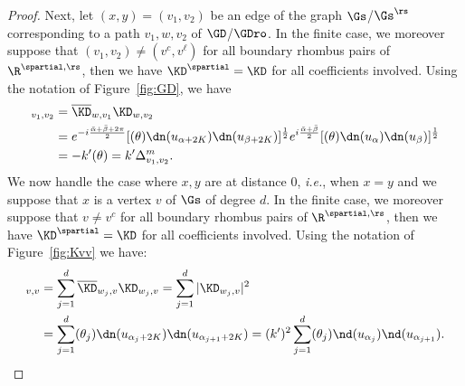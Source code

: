 \documentclass[a4paper,twoside,11pt]{article}
\begin{document}
\begin{proof}
Next, let $(x,y)=(v_1,v_2)$ be an edge of the graph $\Gs$/$\Gs^\rs$ corresponding to a path $v_1,w,v_2$ of $\GD$/$\GDro$. In the finite
case, we moreover suppose that $(v_1,v_2)\neq (v^c,v^\ell)$ for all boundary rhombus pairs of $\R^{\spartial,\rs}$, 
then we have $\KD^\spartial=\KD$ for all coefficients involved. 
Using the notation of Figure~\ref{fig:GD}, we have
\begin{align*}
[\overline{\KD}^{\,t\,}\KD]_{v_1,v_2}&=\overline{\KD}_{w,v_1}\KD_{w,v_2}\\
&=e^{-i\frac{\bar{\alpha}+\bar{\beta}+2\pi}{2}}[\sc(\theta)\dn(u_{\alpha+2K})\dn(u_{\beta+2K})]^{\frac{1}{2}}
e^{i\frac{\bar{\alpha}+\bar{\beta}}{2}}[\sc(\theta)\dn(u_{\alpha})\dn(u_\beta)]^{\frac{1}{2}}\\
&=-k'\sc(\theta)=k'\Delta^m_{v_1,v_2}.
\end{align*}
We now handle the case where $x,y$ are at distance $0$, \emph{i.e.}, when $x=y$ and we suppose that $x$ is a vertex $v$ of $\Gs$ of degree $d$. 
In the finite case, we moreover suppose that $v\neq v^c$ for all boundary rhombus pairs of $\R^{\spartial,\rs}$, then we have $\KD^\spartial=\KD$ for all coefficients involved.
Using the notation of Figure~\ref{fig:Kvv} we have:
\begin{align*}
[\overline{\KD}^{\,t\,}\KD]_{v,v}&=\sum_{j=1}^{d} \overline{\KD}_{w_j,v}\KD_{w_j,v}=
\sum_{j=1}^{d}|\KD_{w_j,v}|^2\\
&=\sum_{j=1}^{d} \sc(\theta_j)\dn(u_{\alpha_j+2K})\dn(u_{\alpha_{j+1}+2K})=
(k')^2 \sum_{j=1}^{d} \sc(\theta_j)\nd(u_{\alpha_j})\nd(u_{\alpha_{j+1}}).
\end{align*}


\end{proof}
\end{document}
